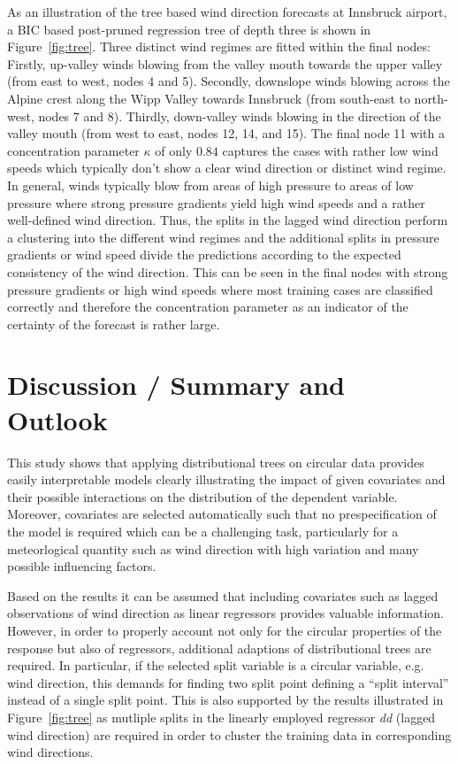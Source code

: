 \documentclass[twoside]{report}
\begin{document}
As an illustration of the tree based wind direction forecasts at Innsbruck
airport, a BIC based post-pruned regression tree of depth three is shown in
Figure~\ref{fig:tree}. Three distinct wind regimes are fitted within the final
nodes: Firstly, up-valley winds blowing from the valley mouth towards the upper
valley (from east to west, nodes 4 and 5). Secondly, downslope winds blowing
across the Alpine crest along the Wipp Valley towards Innsbruck (from
south-east to north-west, nodes 7 and 8). Thirdly, down-valley winds blowing
in the direction of the valley mouth (from west to east, nodes 12, 14, and 15).
The final node 11 with a concentration parameter $\kappa$ of only $0.84$
captures the cases with rather low wind speeds which typically don't show a
clear wind direction or distinct wind regime. In general, winds typically blow
from areas of high pressure to areas of low pressure where strong pressure
gradients yield high wind speeds and a rather well-defined wind direction.
Thus, the splits in the lagged wind direction perform a clustering into the
different wind regimes and the additional splits in pressure gradients or wind
speed divide the predictions according to the expected consistency of the wind
direction. This can be seen in the final nodes with strong pressure gradients
or high wind speeds where most training cases are classified correctly and
therefore the concentration parameter as an indicator of the certainty of the
forecast is rather large. 

\section{Discussion / Summary and Outlook}
This study shows that applying distributional trees on circular data provides easily 
interpretable models clearly illustrating the impact of given covariates and their possible 
interactions on the distribution of the dependent variable. Moreover, covariates are selected
automatically such that no prespecification of the model is required which can be a challenging 
task, particularly for a meteorlogical quantity such as wind direction with high variation and 
many possible influencing factors.

Based on the results it can be assumed that including covariates such as lagged observations of 
wind direction as linear regressors provides valuable information. 
However, in order to properly account not only for the circular properties of the response but 
also of regressors, additional adaptions of distributional trees are required. In particular, 
if the selected split variable is a circular variable, e.g. wind direction, this demands for finding
two split point defining a ``split interval'' instead of a single split point.
This is also supported by the results illustrated in Figure~\ref{fig:tree} as mutliple splits in 
the linearly employed regressor \textit{dd} (lagged wind direction) are required in order to 
cluster the training data in corresponding wind directions.  
\end{document}
